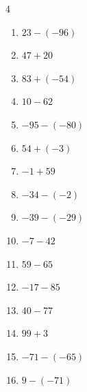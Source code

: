 \begin{multicols}{4}
\begin{enumerate}
\columnbreak %

\resetques

  \item $23-(-96)$

        \phantom{$=119$}

  \item $47+20$

        \phantom{$=67$}

  \item $83+(-54)$

        \phantom{$=29$}

  \item $10-62$

        \phantom{$=-52$}

  \item $-95-(-80)$

        \phantom{$=-15$}

  \item $54+(-3)$

        \phantom{$=51$}

  \item $-1+59$

        \phantom{$=58$}

  \item $-34-(-2)$

        \phantom{$=-32$}

  \item $-39-(-29)$

        \phantom{$=-10$}

  \item $-7-42$

        \phantom{$=-49$}

  \item $59-65$

        \phantom{$=-6$}

  \item $-17-85$

        \phantom{$=-102$}

  \item $40-77$

        \phantom{$=-37$}

  \item $99+3$

        \phantom{$=102$}

  \item $-71-(-65)$

        \phantom{$=-6$}

  \item $9-(-71)$


\end{enumerate}
\end{multicols}
